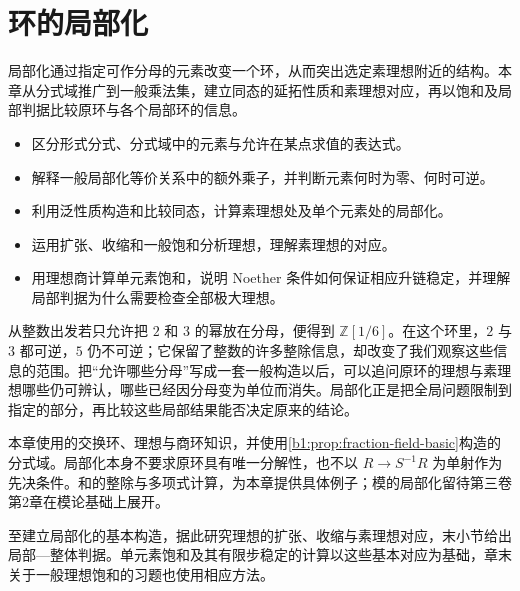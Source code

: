
\chapter{环的局部化}
\label{b1:ch:13}

\begin{chapterabstract}
	局部化通过指定可作分母的元素改变一个环，从而突出选定素理想附近的结构。本章从分式域推广到一般乘法集，建立同态的延拓性质和素理想对应，再以饱和及局部判据比较原环与各个局部环的信息。
\end{chapterabstract}

\begin{learninggoals}
	\begin{itemize}
		\item 区分形式分式、分式域中的元素与允许在某点求值的表达式。
		\item 解释一般局部化等价关系中的额外乘子，并判断元素何时为零、何时可逆。
		\item 利用泛性质构造和比较同态，计算素理想处及单个元素处的局部化。
		\item 运用扩张、收缩和一般饱和分析理想，理解素理想的对应。
		\item 用理想商计算单元素饱和，说明 Noether 条件如何保证相应升链稳定，并理解局部判据为什么需要检查全部极大理想。
	\end{itemize}
\end{learninggoals}

从整数出发若只允许把 \(2\) 和 \(3\) 的幂放在分母，便得到 \(\mathbb Z[1/6]\)。在这个环里，\(2\) 与 \(3\) 都可逆，\(5\) 仍不可逆；它保留了整数的许多整除信息，却改变了我们观察这些信息的范围。把“允许哪些分母”写成一套一般构造以后，可以追问原环的理想与素理想哪些仍可辨认，哪些已经因分母变为单位而消失。局部化正是把全局问题限制到指定的部分，再比较这些局部结果能否决定原来的结论。

\ProseParagraphBreak

本章使用的交换环、理想与商环知识，并使用\cref{b1:prop:fraction-field-basic}构造的分式域。局部化本身不要求原环具有唯一分解性，也不以 \(R\rightarrow S^{-1}R\) 为单射作为先决条件。和的整除与多项式计算，为本章提供具体例子；模的局部化留待第三卷第2章在模论基础上展开。

\ProseParagraphBreak
{}至建立局部化的基本构造，据此研究理想的扩张、收缩与素理想对应，末小节给出局部—整体判据。单元素饱和及其有限步稳定的计算以这些基本对应为基础，章末关于一般理想饱和的习题也使用相应方法。

